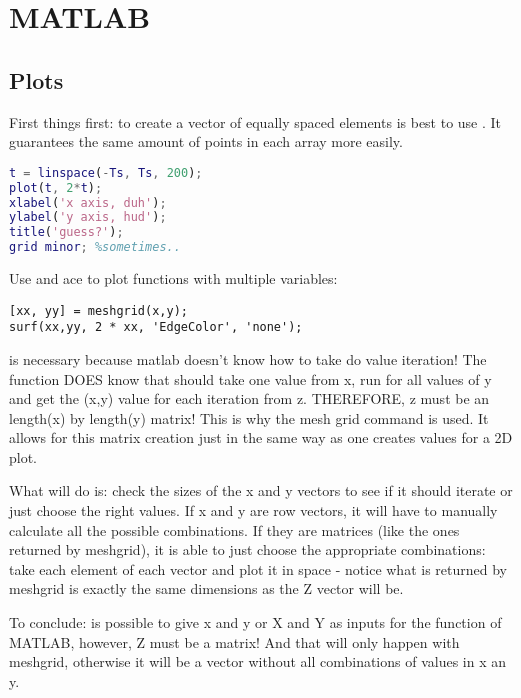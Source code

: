 
\section{MATLAB}

\subsection{Plots}
\par First things first: to create a vector of equally spaced elements is best to use . It guarantees the same amount of points in each array more easily.

\begin{lstlisting}[language=matlab]
t = linspace(-Ts, Ts, 200);
plot(t, 2*t);
xlabel('x axis, duh');
ylabel('y axis, hud'); 
title('guess?');
grid minor; %sometimes..
\end{lstlisting}

\par Use  and \hspace{-.18cm}ace to plot functions with multiple variables:

\begin{lstlisting}
[xx, yy] = meshgrid(x,y);  
surf(xx,yy, 2 * xx, 'EdgeColor', 'none');
\end{lstlisting}

\par {} is necessary because matlab doesn't know how to take do value iteration! The  function DOES know that should take one value from x, run for all values of y and get the (x,y) value for each iteration from z. THEREFORE, z must be an length(x) by length(y) matrix! This is why the mesh grid command is used. It allows for this matrix creation just in the same way as one creates values for a 2D plot.
\par What  will do is: check the sizes of the x and y vectors to see if it should iterate or just choose the right values. If x and y are row vectors, it will have to manually calculate all the possible combinations. If they are matrices (like the ones returned by meshgrid), it is able to just choose the appropriate combinations: take each element of each vector and plot it in space - notice what is returned by meshgrid is exactly the same dimensions as the Z vector will be.
\par To conclude: is possible to give x and y or X and Y as inputs for the  function of MATLAB, however, Z must be a matrix! And that will only happen with meshgrid, otherwise it will be a vector without all combinations of values in x an y.


